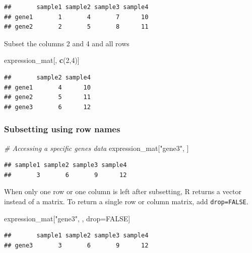 \documentclass[
]{book}
\newenvironment{Shaded}{\begin{snugshade}}{\end{snugshade}}
\newcommand{\CommentTok}[1]{\textcolor[rgb]{0.56,0.35,0.01}{\textit{#1}}}
\newcommand{\ConstantTok}[1]{\textcolor[rgb]{0.56,0.35,0.01}{#1}}
\newcommand{\DecValTok}[1]{\textcolor[rgb]{0.00,0.00,0.81}{#1}}
\newcommand{\FunctionTok}[1]{\textcolor[rgb]{0.13,0.29,0.53}{\textbf{#1}}}
\newcommand{\NormalTok}[1]{#1}
\newcommand{\OtherTok}[1]{\textcolor[rgb]{0.56,0.35,0.01}{#1}}
\newcommand{\StringTok}[1]{\textcolor[rgb]{0.31,0.60,0.02}{#1}}
\begin{document}
\begin{verbatim}
##       sample1 sample2 sample3 sample4
## gene1       1       4       7      10
## gene2       2       5       8      11
\end{verbatim}

Subset the columns 2 and 4 and all rows

\begin{Shaded}
\begin{Highlighting}[]
\NormalTok{expression\_mat[, }\FunctionTok{c}\NormalTok{(}\DecValTok{2}\NormalTok{,}\DecValTok{4}\NormalTok{)]}
\end{Highlighting}
\end{Shaded}

\begin{verbatim}
##       sample2 sample4
## gene1       4      10
## gene2       5      11
## gene3       6      12
\end{verbatim}

\hypertarget{subsetting-using-row-names}{%
\subsubsection{Subsetting using row names}\label{subsetting-using-row-names}}

\begin{Shaded}
\begin{Highlighting}[]
\CommentTok{\# Accessing a specific gene\textquotesingle{}s data}
\NormalTok{expression\_mat[}\StringTok{"gene3"}\NormalTok{, ]}
\end{Highlighting}
\end{Shaded}

\begin{verbatim}
## sample1 sample2 sample3 sample4 
##       3       6       9      12
\end{verbatim}

When only one row or one column is left after subsetting, R returns a vector instead of a matrix. To return a single row or column matrix, add \texttt{drop=FALSE}.

\begin{Shaded}
\begin{Highlighting}[]
\NormalTok{expression\_mat[}\StringTok{"gene3"}\NormalTok{, , drop}\OtherTok{=}\ConstantTok{FALSE}\NormalTok{]}
\end{Highlighting}
\end{Shaded}

\begin{verbatim}
##       sample1 sample2 sample3 sample4
## gene3       3       6       9      12
\end{verbatim}
\end{document}
